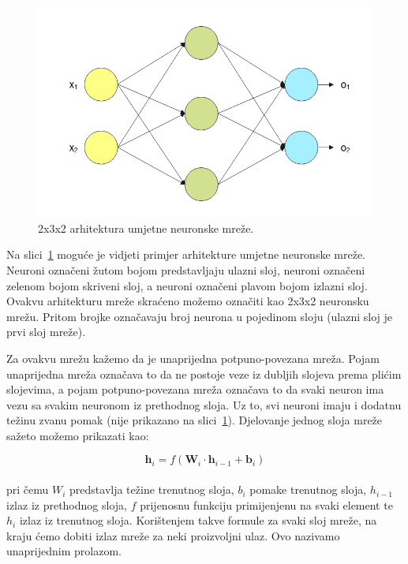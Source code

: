\documentclass[times, utf8, zavrsni, numeric]{fer}
\begin{document}
\pagebreak
\begin{figure}[htb]
    \centering
    \includegraphics{basic_nn_labeled.png}
    \caption{2x3x2 arhitektura umjetne neuronske mreže.}
    \label{fig:basic_nn}
\end{figure}

Na slici~\ref{fig:basic_nn} moguće je vidjeti primjer arhitekture umjetne neuronske mreže. 
Neuroni označeni žutom bojom predstavljaju ulazni sloj, neuroni označeni zelenom bojom skriveni sloj, a neuroni označeni plavom bojom izlazni sloj. 
Ovakvu arhitekturu mreže skraćeno možemo označiti kao 2x3x2 neuronsku mrežu. Pritom brojke označavaju broj neurona u pojedinom sloju (ulazni sloj je prvi sloj mreže).

Za ovakvu mrežu kažemo da je unaprijedna potpuno-povezana mreža. 
Pojam unaprijedna mreža označava to da ne postoje veze iz dubljih slojeva prema plićim slojevima, a pojam potpuno-povezana mreža označava to da svaki neuron ima vezu sa svakim neuronom iz prethodnog sloja.
Uz to, svi neuroni imaju i dodatnu težinu zvanu pomak (nije prikazano na slici~\ref{fig:basic_nn}). Djelovanje jednog sloja mreže sažeto možemo prikazati kao:

\begin{equation}
    \pmb{h}_{i} = f(\pmb{W}_{i} \cdot \pmb{h}_{i-1} + \pmb{b}_{i})
    \label{eq:nn_layer}
\end{equation}
\\
pri čemu $W_{i}$ predstavlja težine trenutnog sloja, $b_{i}$ pomake trenutnog sloja, $h_{i-1}$ izlaz iz prethodnog sloja, $f$ prijenosnu funkciju primijenjenu na svaki element te $h_{i}$ izlaz iz trenutnog sloja.
Korištenjem takve formule za svaki sloj mreže, na kraju ćemo dobiti izlaz mreže za neki proizvoljni ulaz. Ovo nazivamo unaprijednim prolazom.
\end{document}
